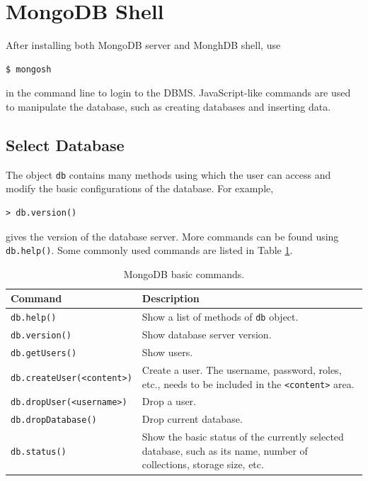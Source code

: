 \section{MongoDB Shell}

After installing both MongoDB server and MonghDB shell, use
\begin{lstlisting}
$ mongosh
\end{lstlisting}
in the command line to login to the DBMS. JavaScript-like commands are used to manipulate the database, such as creating databases and inserting data.

\subsection{Select Database}

The object \verb|db| contains many methods using which the user can access and modify the basic configurations of the database. For example,
\begin{lstlisting}
> db.version()
\end{lstlisting}
gives the version of the database server. More commands can be found using \verb|db.help()|. Some commonly used commands are listed in Table \ref{ch:db:tab:mongodbbasics}.
\begin{table}[!htb]
	\centering \caption{MongoDB basic commands.}\label{ch:db:tab:mongodbbasics}
	\begin{tabularx}{\textwidth}{lX}
		\hline
		Command & Description \\ \hline
        \verb|db.help()| & Show a list of methods of \verb|db| object. \\ 
		\verb|db.version()| & Show database server version. \\ 
        \verb|db.getUsers()| & Show users. \\ 
        \verb|db.createUser(<content>)| & Create a user. The username, password, roles, etc., needs to be included in the \verb|<content>| area. \\ 
        \verb|db.dropUser(<username>)| & Drop a user. \\ 
        \verb|db.dropDatabase()| & Drop current database. \\ 
		\verb|db.status()| & Show the basic status of the currently selected database, such as its name, number of collections, storage size, etc.  \\
		 \hline
	\end{tabularx}
\end{table}

